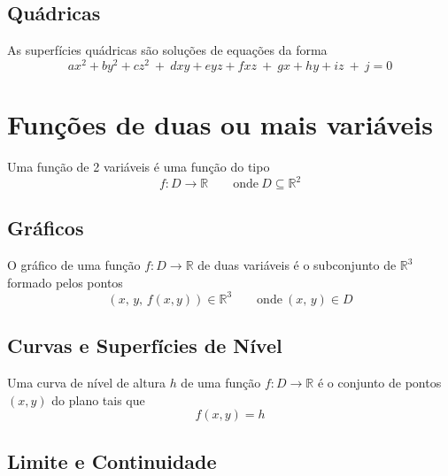 \documentclass{article}
\begin{document}
\subsection{Quádricas}
As superfícies quádricas são soluções de equações da forma
\[ ax^2 + by^2 + cz^2 \> + \> dxy + eyz + fxz \> + \> gx + hy + iz \> + \> j = 0 \]


\section{Funções de duas ou mais variáveis}
Uma função de 2 variáveis é uma função do tipo
\[ f: D \rightarrow \mathbb{R} \qquad \text{onde} \> D \subseteq \mathbb{R}^2 \]

\subsection{Gráficos}
O gráfico de uma função $f: D \rightarrow \mathbb{R}$ de duas variáveis é o subconjunto de $\mathbb{R}^3$ formado pelos pontos
\[ (x,\, y,\, f(x, y)) \in \mathbb{R}^3 \qquad \text{onde} \> (x,\, y) \in D \]


\subsection{Curvas e Superfícies de Nível}
Uma curva de nível de altura $h$ de uma função $f: D \to \mathbb{R}$ é o conjunto de pontos $(x, y)$ do plano tais que
\[ f(x,y) = h \]


\pagebreak

\subsection{Limite e Continuidade}
\end{document}
